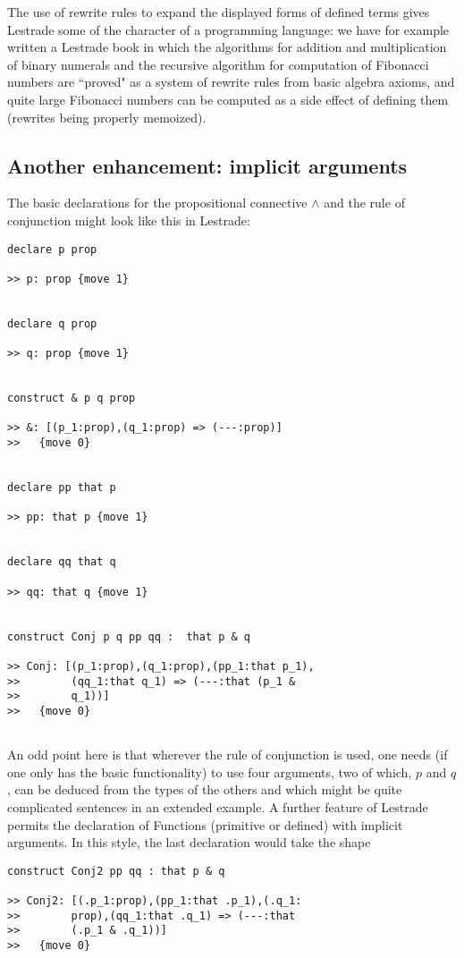 \documentclass{article}
\begin{document}
The use of rewrite rules to expand the displayed forms of defined terms gives Lestrade some of the character of a programming language:  we have for example written a Lestrade book in which the algorithms for addition and multiplication of binary numerals and the recursive algorithm for computation of Fibonacci numbers are ``proved" as a system of rewrite rules from basic algebra axioms, and quite large Fibonacci numbers can be computed as a side effect of defining them (rewrites being properly memoized).

\subsection{Another enhancement:  implicit arguments}

The basic declarations for the propositional connective $\wedge$ and the rule of conjunction might look like this in Lestrade:

\begin{verbatim}
declare p prop

>> p: prop {move 1}


declare q prop

>> q: prop {move 1}


construct & p q prop

>> &: [(p_1:prop),(q_1:prop) => (---:prop)]
>>   {move 0}


declare pp that p

>> pp: that p {move 1}


declare qq that q

>> qq: that q {move 1}


construct Conj p q pp qq :  that p & q

>> Conj: [(p_1:prop),(q_1:prop),(pp_1:that p_1),
>>        (qq_1:that q_1) => (---:that (p_1 & 
>>        q_1))]
>>   {move 0}


\end{verbatim}

An odd point here is that wherever the rule of conjunction is used, one needs (if one only has the basic functionality) to use four arguments, two of which,
$p$ and $q$, can be deduced from the types of the others and which might be quite complicated sentences in an extended example.  A further feature of Lestrade permits the declaration of Functions (primitive or defined) with implicit arguments.  In this style, the last declaration would take the shape

\begin{verbatim}
construct Conj2 pp qq : that p & q

>> Conj2: [(.p_1:prop),(pp_1:that .p_1),(.q_1:
>>        prop),(qq_1:that .q_1) => (---:that 
>>        (.p_1 & .q_1))]
>>   {move 0}


\end{verbatim}
\end{document}

